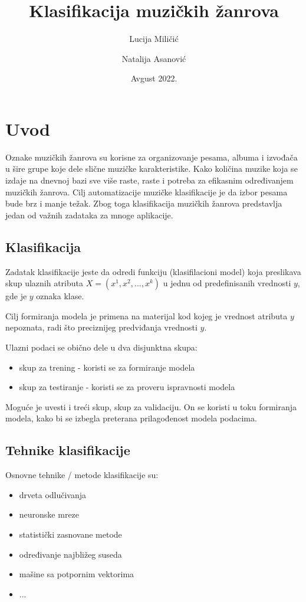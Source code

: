 \documentclass{article}
\title{Klasifikacija muzičkih žanrova}
\author{Lucija Miličić \and Natalija Asanović}
\date{Avgust 2022.}
\begin{document}
\maketitle

\newpage

\section{Uvod}

Oznake muzičkih žanrova su korisne za organizovanje pesama, albuma i izvođača u šire grupe koje dele slične muzičke karakteristike. Kako količina muzike koja se izdaje na dnevnoj bazi sve više raste, raste i potreba za efikasnim određivanjem muzičkih žanrova. Cilj automatizacije muzičke klasifikacije je da izbor pesama bude brz i manje težak. Zbog toga klasifikacija muzičkih žanrova predstavlja jedan od važnih zadataka za mnoge aplikacije.

\subsection{Klasifikacija}
Zadatak klasifikacije jeste da odredi funkciju (klasifilacioni model) koja preslikava skup ulaznih atributa $X = (x^1, x^2, ..., x^k)$ u jednu od predefinisanih vrednosti $y$, gde je $y$ oznaka klase. 

Cilj formiranja modela je primena na materijal kod kojeg je vrednost atributa $y$ nepoznata, radi što preciznijeg predviđanja vrednosti $y$.

Ulazni podaci se obično dele u dva disjunktna skupa:
\begin{itemize}
    \item skup za trening - koristi se za formiranje modela
    \item skup za testiranje - koristi se za proveru ispravnosti modela
\end{itemize}

Moguće je uvesti i treći skup, skup za validaciju. On se koristi u toku formiranja modela, kako bi se izbegla preterana prilagođenost modela podacima.

\subsection{Tehnike klasifikacije}
Osnovne tehnike / metode klasifikacije su:
\begin{itemize}
    \item drveta odlučivanja
    \item neuronske mreze
    \item statistički zasnovane metode
    \item određivanje najbližeg suseda
    \item mašine sa potpornim vektorima
    \item ...
\end{itemize}
\end{document}
